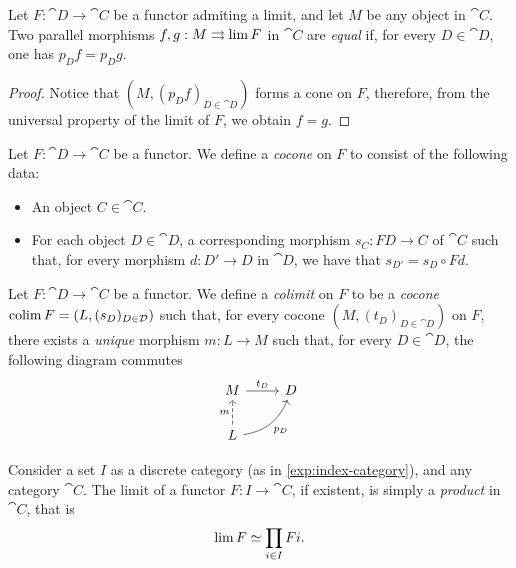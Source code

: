 \begin{proposition}
\label{prop:equal-parallel-factorizations}
Let \(F: \cat D \to \cat C\) be a functor admiting a limit, and let \(M\) be any
object in \(\cat C\). Two parallel morphisms \(f, g: M \rightrightarrows \operatorname{lim} F\) in
\(\cat C\) are \emph{equal} if, for every \(D \in \cat D\), one has
\(p_D f = p_D g\).
\end{proposition}

\begin{proof}
Notice that \((M, (p_D f)_{D \in \cat D})\) forms a cone on \(F\), therefore,
from the universal property of the limit of \(F\), we obtain \(f = g\).
\end{proof}

\begin{definition}[Cocone]
\label{def:cocone}
Let \(F: \cat D \to \cat C\) be a functor. We define a \emph{cocone} on \(F\) to
consist of the following data:
\begin{itemize}\setlength\itemsep{0em}
\item An object \(C \in \cat C\).

\item For each object \(D \in \cat D\), a corresponding morphism \(s_C: F D \to
  C\) of \(\cat C\) such that, for every morphism \(d: D' \to D\) in \(\cat D\),
  we have that \(s_{D'} = s_D \circ F d\).
\end{itemize}
\end{definition}

\begin{definition}[Colimit]
\label{def:colimit}
Let \(F: \cat D \to \cat C\) be a functor. We define a \emph{colimit} on \(F\)
to be a \emph{cocone} \(\operatorname{colim} F = (L, (s_D)_{D \in \mathcal D})\) such that, for
every cocone \((M, (t_D)_{D \in \cat D})\) on \(F\), there exists a
\emph{unique} morphism \(m: L \to M\) such that, for every \(D \in \cat D\), the
following diagram commutes
\[
\begin{tikzcd}
M \ar[r, "t_D"] &D \\
L \ar[u, dashed, "m"] \ar[ru, bend right, "p_D"'] &
\end{tikzcd}
\]
\end{definition}

\begin{example}[Products]
\label{exp:product-is-limit-over-indexing-set-diagram}
Consider a set \(I\) as a discrete category (as in \cref{exp:index-category}),
and any category \(\cat C\). The limit of a functor \(F: I \to \cat C\), if
existent, is simply a \emph{product} in \(\cat C\), that is
\[
\operatorname{lim} F \simeq \prod_{i \in I} F i.
\]
\end{example}

